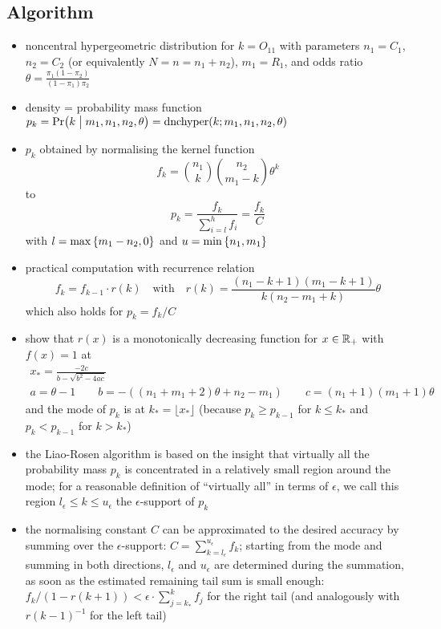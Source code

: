 \documentclass[a4paper]{article}
\begin{document}
\subsection{Algorithm}
\label{sec:fisher:algo}

\begin{itemize}
\item noncentral hypergeometric distribution for $k = O_{11}$ with parameters $n_1 = C_1$, $n_2 = C_2$ (or equivalently $N = n = n_1 + n_2$), $m_1 = R_1$, and odds ratio $\theta = \frac{\pi_1 (1 - \pi_2)}{(1 - \pi_1) \pi_2}$
\item density = probability mass function $p_k = \mathop{\mathrm{Pr}}\bigl(k\bigm|m_1, n_1, n_2, \theta\bigr) = \mathop{\text{dnchyper}}(k; m_1, n_1, n_2, \theta)$
\item $p_k$ obtained by normalising the kernel function
  \[
    f_k = \binom{n_1}{k} \binom{n_2}{m_1 - k} \theta^k
  \]
  to
  \[
    p_k = \frac{ f_k }{ \sum_{i=l}^h f_i } = \frac{ f_k }{ C }
  \]
  with $l = \max\left\{m_1 - n_2, 0\right\}$ and $u = \min\left\{n_1, m_1\right\}$
\item practical computation with recurrence relation \citep[366]{Liao:Rosen:01}
  \[
    f_k = f_{k-1}\cdot r(k) \quad\text{with}\quad
    r(k) = \frac{(n_1 - k + 1)(m_1 - k + 1)}{k (n_2 - m_1 + k)} \theta
  \]
  which also holds for $p_k = f_k / C$
\item \citet[369]{Liao:Rosen:01} show that $r(x)$ is a monotonically decreasing function for $x\in\mathbb{R}_+$ with $f(x) = 1$ at
  \begin{gather*}
    x_* = \frac{-2c}{b - \sqrt{b^2 - 4ac}}\\
    a = \theta - 1 \qquad
    b = -((n_1 + m_1 + 2)\theta + n_2 - m_1) \qquad
    c = (n_1 + 1) (m_1 + 1) \theta
  \end{gather*}
  and the mode of $p_k$ is at $k_* = \lfloor x_* \rfloor$ (because $p_k \geq p_{k-1}$ for $k \leq k_*$ and $p_k < p_{k-1}$ for $k > k_*$)
\item the Liao-Rosen algorithm is based on the insight that virtually all the probability mass $p_k$ is concentrated in a relatively small region around the mode; for a reasonable definition of ``virtually all'' in terms of $\epsilon$, we call this region $l_{\epsilon}\leq k\leq u_{\epsilon}$ the $\epsilon$-support of $p_k$
\item the normalising constant $C$ can be approximated to the desired accuracy by summing over the $\epsilon$-support: $C = \sum_{k = l_{\epsilon}}^{u_{\epsilon}} f_k$; starting from the mode and summing in both directions, $l_{\epsilon}$ and $u_{\epsilon}$ are determined during the summation, as soon as the estimated remaining tail sum is small enough: $f_k / (1 - r(k+1)) < \epsilon\cdot \sum_{j=k_*}^{k} f_j$ for the right tail (and analogously with $r(k-1)^{-1}$ for the left tail)

\end{itemize}
\end{document}
